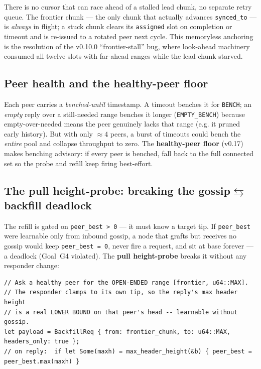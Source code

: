 \documentclass[11pt,a4paper]{article}
\newcommand{\code}[1]{\lstinline[basicstyle=\ttfamily\normalsize\color{codekw}]{#1}}
\begin{document}
\noindent
There is no cursor that can race ahead of a stalled lead chunk, no separate retry
queue. The frontier chunk --- the only chunk that actually advances
\code{synced_to} --- is \emph{always} in flight; a stuck chunk clears its
\texttt{assigned} slot on completion or timeout and is re-issued to a rotated
peer next cycle. This memoryless anchoring is the resolution of the v0.10.0
``frontier-stall'' bug, where look-ahead machinery consumed all twelve slots with
far-ahead ranges while the lead chunk starved.

\subsection{Peer health and the healthy-peer floor}

Each peer carries a \emph{benched-until} timestamp. A timeout benches it for
\texttt{BENCH}; an \emph{empty} reply over a still-needed range benches it longer
(\texttt{EMPTY\_BENCH}) because empty-over-needed means the peer genuinely lacks
that range (e.g. it pruned early history). But with only $\approx 4$ peers, a
burst of timeouts could bench the \emph{entire} pool and collapse throughput to
zero. The \textbf{healthy-peer floor} (v0.17) makes benching advisory: if every
peer is benched, fall back to the full connected set so the probe and refill keep
firing best-effort.

\subsection{The pull height-probe: breaking the gossip$\leftrightarrows$backfill deadlock}

The refill is gated on \texttt{peer\_best > 0} --- it must know a target tip. If
\texttt{peer\_best} were learnable only from inbound gossip, a node that grafts
but receives no gossip would keep \texttt{peer\_best = 0}, never fire a request,
and sit at base forever --- a deadlock (Goal~G4 violated). The \textbf{pull
height-probe} breaks it without any responder change:

\begin{lstlisting}
// Ask a healthy peer for the OPEN-ENDED range [frontier, u64::MAX].
// The responder clamps to its own tip, so the reply's max header height
// is a real LOWER BOUND on that peer's head -- learnable without gossip.
let payload = BackfillReq { from: frontier_chunk, to: u64::MAX, headers_only: true };
// on reply:  if let Some(maxh) = max_header_height(&b) { peer_best = peer_best.max(maxh) }
\end{lstlisting}
\end{document}
